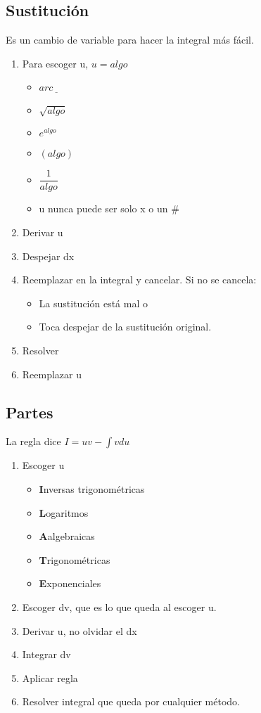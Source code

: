 \subsection{Sustitución}
Es un cambio de variable para hacer la integral más fácil.
\begin{enumerate}
	\item Para escoger u, $u=algo$
	\begin{itemize}
		\item $arc\underline{\ \ \ }$
		\item $\sqrt{algo}$
		\item $e^{algo}$
		\item $(algo)$
		\item $\dfrac{1}{algo}$
		\item u nunca puede ser solo x o un $\#$
	\end{itemize}
	\item Derivar u
	\item Despejar dx
	\item Reemplazar en la integral y cancelar. Si no se cancela:
	\begin{itemize}
		\item La sustitución está mal o
		\item Toca despejar de la sustitución original.
	\end{itemize}
	\item Resolver
	\item Reemplazar u
\end{enumerate}

\subsection{Partes}
La regla dice $I=uv-\int vdu$
\begin{enumerate}
	\item Escoger u
	\begin{itemize}
		\item \textbf{I}nversas trigonométricas
		\item \textbf{L}ogaritmos
		\item \textbf{A}algebraicas
		\item \textbf{T}rigonométricas
		\item \textbf{E}xponenciales
	\end{itemize}
	\item Escoger dv, que es lo que queda al escoger u.
	\item Derivar u, no olvidar el dx
	\item Integrar dv
	\item Aplicar regla
	\item Resolver integral que queda por cualquier método.
\end{enumerate}

